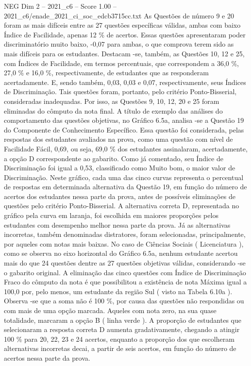 \begin{textsample}{NEG Dim 2 – 2021\_c6 – Score 1.00 – 2021\_c6/enade\_2021\_ci\_soc\_edcb3715cc.txt}
As Questões de número 9 e 20 foram as mais difíceis entre as 27 questões específicas válidas, ambas com baixo Índice de Facilidade, apenas 12 \% de acertos.
Essas questões apresentaram poder discriminatório muito baixo, -0,07 para ambas, o que comprova terem sido as mais difíceis para os estudantes.
Destacam -se, também, as Questões 10, 12 e 25, com Índices de Facilidade, em termos percentuais, que correspondem a 36,0 \%, 27,0 \% e 16,0 \%, respectivamente, de estudantes que as responderam acertadamente.
E, sendo também, 0,03, 0,03 e 0,07, respectivamente, seus Índices de Discriminação.
Tais questões foram, portanto, pelo critério Ponto-Bisserial, consideradas inadequadas.
Por isso, as Questões 9, 10, 12, 20 e 25 foram eliminadas do cômputo da nota final.
A título de exemplo das análises do comportamento das questões objetivas, no Gráfico 6.5a, analisa -se a Questão 19 do Componente de Conhecimento Específico.
Essa questão foi considerada, pelas respostas dos estudantes avaliados na prova, como uma questão com nível de Facilidade Fácil, 0,69, ou seja, 69,0 \% dos estudantes assinalaram, acertadamente, a opção D correspondente ao gabarito.
Como já comentado, seu Índice de Discriminação foi igual a 0,53, classificado como Muito bom, o maior valor de Discriminação.
Neste gráfico, cada uma das cinco curvas representa o percentual de respostas em determinada alternativa da Questão 19, em função do número de acertos dos estudantes nessa parte da prova, antes de possíveis eliminações de questões pelo critério Ponto-Bisserial.
A alternativa correta D, representada no gráfico pela curva em laranja, foi escolhida em maiores proporções pelos estudantes com desempenho melhor nessa parte da prova.
Já as alternativas incorretas, também denominadas distratores, foram selecionadas, principalmente, por aqueles com notas mais baixas.
No caso de Ciências Sociais ( Licenciatura ), como se observa no eixo horizontal do Gráfico 6.5a, nenhum estudante acertou mais do que 24 questões dentre as 27 questões objetivas válidas, considerando -se o gabarito original.
A eliminação das cinco questões com Índice de Discriminação Fraco do cômputo da nota é que possibilitou a existência de nota Máxima igual a 100,0 por, pelo menos, um estudante da região Sul ( visto na Tabela 6.10a ).
Observa -se que a soma não é 100 \%, por causa das questões não respondidas ou com mais de uma opção marcada.
Aqueles com nota zero, na sua quase totalidade, marcaram a opção B ( linha verde ).
A proporção de estudantes que selecionaram a resposta correta D aumenta gradativamente, chegando a atingir 100 \% para 20, 22, 23 e 24 acertos, enquanto a proporção dos que escolheram alternativas incorretas decai, a partir de seis acertos, em função do número de acertos nessa parte da prova.

\end{textsample}
